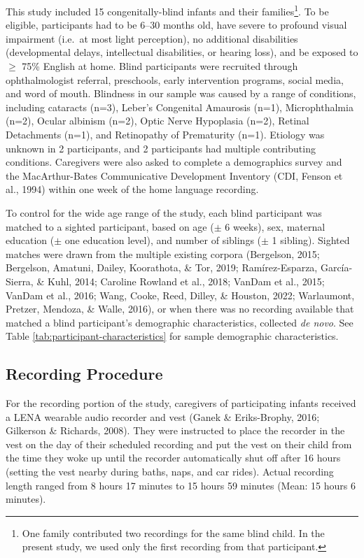 \documentclass[
  man,floatsintext]{apa6}
\begin{document}
This study included 15 congenitally-blind infants and their families\footnote{One family contributed two recordings for the same blind child. In the present study, we used only the first recording from that participant.}. To be eligible, participants had to be 6--30 months old, have severe to profound visual impairment (i.e.~at most light perception), no additional disabilities (developmental delays, intellectual disabilities, or hearing loss), and be exposed to \(\geq\) 75\% English at home. Blind participants were recruited through ophthalmologist referral, preschools, early intervention programs, social media, and word of mouth. Blindness in our sample was caused by a range of conditions, including cataracts (n=3), Leber's Congenital Amaurosis (n=1), Microphthalmia (n=2), Ocular albinism (n=2), Optic Nerve Hypoplasia (n=2), Retinal Detachments (n=1), and Retinopathy of Prematurity (n=1). Etiology was unknown in 2 participants, and 2 participants had multiple contributing conditions. Caregivers were also asked to complete a demographics survey and the MacArthur-Bates Communicative Development Inventory (CDI, Fenson et al., 1994) within one week of the home language recording.

To control for the wide age range of the study, each blind participant was matched to a sighted participant, based on age (\(\pm\) 6 weeks), sex, maternal education (\(\pm\) one education level), and number of siblings (\(\pm\) 1 sibling). Sighted matches were drawn from the multiple existing corpora (Bergelson, 2015; Bergelson, Amatuni, Dailey, Koorathota, \& Tor, 2019; Ramírez-Esparza, García-Sierra, \& Kuhl, 2014; Caroline Rowland et al., 2018; VanDam et al., 2015; VanDam et al., 2016; Wang, Cooke, Reed, Dilley, \& Houston, 2022; Warlaumont, Pretzer, Mendoza, \& Walle, 2016), or when there was no recording available that matched a blind participant's demographic characteristics, collected \emph{de novo}. See Table \ref{tab:participant-characteristics} for sample demographic characteristics.

\hypertarget{recording-procedure}{%
\subsection{Recording Procedure}\label{recording-procedure}}

For the recording portion of the study, caregivers of participating infants received a LENA wearable audio recorder and vest (Ganek \& Eriks-Brophy, 2016; Gilkerson \& Richards, 2008). They were instructed to place the recorder in the vest on the day of their scheduled recording and put the vest on their child from the time they woke up until the recorder automatically shut off after 16 hours (setting the vest nearby during baths, naps, and car rides). Actual recording length ranged from 8 hours 17 minutes to 15 hours 59 minutes (Mean: 15 hours 6 minutes).
\end{document}
